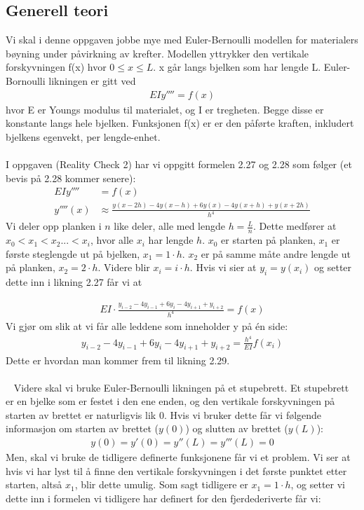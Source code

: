 \subsection{Generell teori}
Vi skal i denne oppgaven jobbe mye med Euler-Bernoulli modellen for materialers bøyning under påvirkning av krefter. Modellen yttrykker den vertikale forskyvningen f(x) hvor $0\leq x \leq L$. x går langs bjelken som har lengde L. Euler-Bornoulli likningen er gitt ved 
\begin{align}
    EIy''''=f(x)
\end{align}
hvor E er Youngs modulus til materialet, og I er tregheten. Begge disse er konstante langs hele bjelken. Funksjonen f(x) er er den påførte kraften, inkludert bjelkens egenvekt, per lengde-enhet. 
\\ \\
I oppgaven (Reality Check 2) har vi oppgitt formelen 2.27 og 2.28 som følger (et bevis på 2.28 kommer senere): 
\begin{align}
    EIy''''&=f(x) \nonumber \\
    y''''(x)& \approx \frac{y(x-2h)-4y(x-h)+6y(x)-4y(x+h)+y(x+2h)}{h^4}
\end{align}
Vi deler opp planken i $n$ like deler, alle med lengde $h=\frac{L}{n}$. Dette medfører at $x_0<x_1<x_2...<x_i$, hvor alle $x_i$ har lengde $h$. $x_0$ er starten på planken, $x_1$ er første steglengde ut på bjelken, $x_1=1\cdot h$. $x_2$ er på samme måte andre lengde ut på planken, $x_2=2\cdot h$. Videre blir $x_i=i\cdot h$. Hvis vi sier at $y_i=y(x_i)$ og setter dette inn i likning 2.27 får vi at 

\begin{align}
EI\cdot	\frac{y_{i-2}-4y_{i-1}+6y_i-4y_{i+1}+y_{i+2}}{h^4}=f(x)
\end{align}
Vi gjør om slik at vi får alle leddene som inneholder y på én side:
\begin{align}
    y_{i-2}-4y_{i-1}+6y_i-4y_{i+1}+y_{i+2}=\frac{h^4}{EI}f(x_i)
\end{align}
Dette er hvordan man kommer frem til likning 2.29. 
\\ \\ 
Videre skal vi bruke Euler-Bernoulli likningen på et stupebrett. Et stupebrett er en bjelke som er festet i den ene enden, og den vertikale forskyvningen på starten av brettet er naturligvis lik 0. Hvis vi bruker dette får vi følgende informasjon om starten av brettet ($y(0)$) og slutten av brettet ($y(L)$):
\begin{align}
    y(0)=y'(0)=y''(L)=y'''(L)=0
\end{align}
Men, skal vi bruke de tidligere definerte funksjonene får vi et problem. Vi ser at hvis vi har lyst til å finne den vertikale forskyvningen i det første punktet etter starten, altså $x_1$, blir dette umulig. Som sagt tidligere er $x_1=1\cdot h$, og setter vi dette inn i formelen vi tidligere har definert for den fjerdederiverte får vi: 

